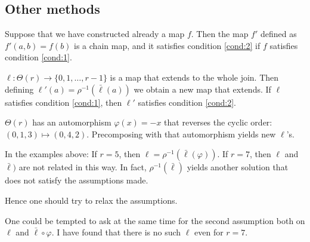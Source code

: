 \subsection{Other methods}

Suppose that we have constructed already a map $f$. Then the map $f'$ defined as $f'(a,b) = f(b)$ is a chain map, and it satisfies condition \eqref{cond:2} if $f$ satisfies condition \eqref{cond:1}.

$\ell\colon \Theta(r)\to \{0,1,\ldots,r-1\}$ is a map that extends to the whole join. Then defining $\ell'(a) = \rho^{-1}(\bar{\ell}(a))$ we obtain a new map that extends. If $\ell$ satisfies condition \eqref{cond:1}, then $\ell'$ satisfies condition \eqref{cond:2}.

$\Theta(r)$ has an automorphism $\varphi(x)= -x$ that reverses the cyclic order: $(0,1,3)\mapsto (0,4,2)$. Precomposing with that automorphism yields new $\ell$'s.

In the examples above: If $r=5$, then $\ell = \rho^{-1}(\bar{\ell}(\varphi))$. If $r=7$, then $\ell$ and $\bar{\ell})$ are not related in this way. In fact, $\rho^{-1}(\bar{\ell})$ yields another solution that does not satisfy the assumptions made.

Hence one should try to relax the assumptions.

\begin{remark}
	One could be tempted to ask at the same time for the second assumption both on $\ell$ and $\bar{\ell}\circ \varphi$. I have found that there is no such $\ell$ even for $r=7$.
\end{remark}